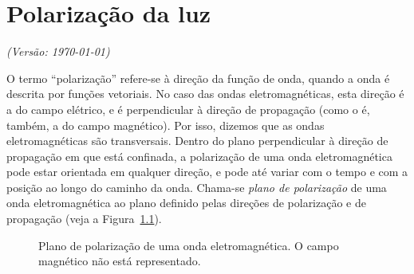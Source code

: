 \chapter{Polarização da luz}
\textsl{{\sffamily(Versão: \today)}}

\noindent
O termo ``polarização'' refere-se à direção da função de onda, quando a onda é
descrita por funções vetoriais. No caso das ondas eletromagnéticas, esta
direção é a do campo elétrico, e é perpendicular à direção de propagação (como o
é, também, a do campo magnético). Por isso, dizemos que as ondas
eletromagnéticas são transversais. Dentro do plano perpendicular à direção de
propagação em que está confinada, a polarização de uma onda eletromagnética pode
estar orientada em qualquer direção, e pode até variar com o tempo e com a
posição ao longo do caminho da onda.  Chama-se \emph{plano de polarização} de
uma onda eletromagnética ao plano definido pelas direções de polarização e de
propagação (veja a Figura~\ref{fig:polpln}).
\begin{figure}[htb]
    \small
    \sffamily
    {\centering
    \def\zangle{-20}
    \def\xangle{20}

    \par
}
\caption{Plano de polarização de uma onda eletromagnética. O campo magnético não
está representado.\label{fig:polpln}}
\end{figure}
